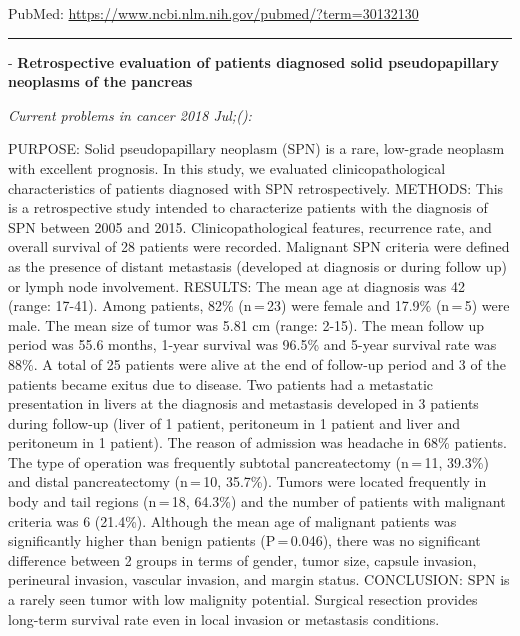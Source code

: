 \documentclass[]{article}
\begin{document}
PubMed: \url{https://www.ncbi.nlm.nih.gov/pubmed/?term=30132130}

{}

{}

\begin{center}\rule{0.5\linewidth}{\linethickness}\end{center}

 - \textbf{Retrospective evaluation of patients diagnosed solid
pseudopapillary neoplasms of the pancreas}

\emph{Current problems in cancer 2018 Jul;():}

PURPOSE: Solid pseudopapillary neoplasm (SPN) is a rare, low-grade
neoplasm with excellent prognosis. In this study, we evaluated
clinicopathological characteristics of patients diagnosed with SPN
retrospectively. METHODS: This is a retrospective study intended to
characterize patients with the diagnosis of SPN between 2005 and 2015.
Clinicopathological features, recurrence rate, and overall survival of
28 patients were recorded. Malignant SPN criteria were defined as the
presence of distant metastasis (developed at diagnosis or during follow
up) or lymph node involvement. RESULTS: The mean age at diagnosis was 42
(range: 17-41). Among patients, 82\% (n\,=\,23) were female and 17.9\%
(n\,=\,5) were male. The mean size of tumor was 5.81 cm (range: 2-15).
The mean follow up period was 55.6 months, 1-year survival was 96.5\%
and 5-year survival rate was 88\%. A total of 25 patients were alive at
the end of follow-up period and 3 of the patients became exitus due to
disease. Two patients had a metastatic presentation in livers at the
diagnosis and metastasis developed in 3 patients during follow-up (liver
of 1 patient, peritoneum in 1 patient and liver and peritoneum in 1
patient). The reason of admission was headache in 68\% patients. The
type of operation was frequently subtotal pancreatectomy (n\,=\,11,
39.3\%) and distal pancreatectomy (n\,=\,10, 35.7\%). Tumors were
located frequently in body and tail regions (n\,=\,18, 64.3\%) and the
number of patients with malignant criteria was 6 (21.4\%). Although the
mean age of malignant patients was significantly higher than benign
patients (P\,=\,0.046), there was no significant difference between 2
groups in terms of gender, tumor size, capsule invasion, perineural
invasion, vascular invasion, and margin status. CONCLUSION: SPN is a
rarely seen tumor with low malignity potential. Surgical resection
provides long-term survival rate even in local invasion or metastasis
conditions.
\end{document}
